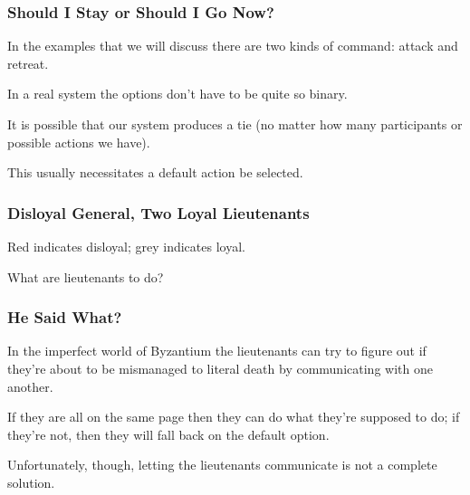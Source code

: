 \begin{frame}
\frametitle{Should I Stay or Should I Go Now?}

In the examples that we will discuss there are two kinds of command: attack and retreat. 

In a real system the options don't have to be quite so binary.

It is possible that our system produces a tie (no matter how many participants or possible actions we have). 

This usually necessitates a default action be selected.

\end{frame}



\begin{frame}
\frametitle{Disloyal General, Two Loyal Lieutenants}

\begin{center}
\end{center}

Red indicates disloyal; grey indicates loyal.

What are lieutenants to do? 

\end{frame}


\begin{frame}
\frametitle{He Said What?}

In the imperfect world of Byzantium the lieutenants can try to figure out if they're about to be mismanaged to literal death by communicating with one another. 

If they are all on the same page then they can do what they're supposed to do; if they're not, then they will fall back on the default option.

Unfortunately, though, letting the lieutenants communicate is not a complete solution.

\end{frame}



